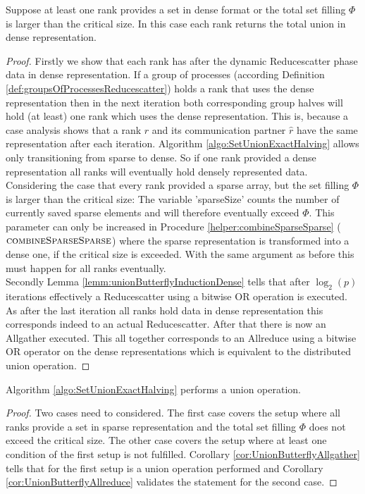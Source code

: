 \begin{corollary}
	Suppose at least one rank provides a set in dense format or the total set filling $\Phi$ is larger than the critical size. In this case each rank returns the total union in dense representation.
\end{corollary}\label{cor:UnionButterflyAllreduce}
\begin{proof}
	Firstly we show that each rank has after the dynamic Reducescatter phase data in dense representation. If a group of processes (according Definition \ref{def:groupsOfProcessesReducescatter}) holds a rank that uses the dense representation then in the next iteration both corresponding group halves will hold (at least) one rank which uses the dense representation. This is, because a case analysis shows that a rank $r$ and its communication partner $\hat{r}$ have the same representation after each iteration. Algorithm \ref{algo:SetUnionExactHalving} allows only transitioning from sparse to dense. So if one rank provided a dense representation all ranks will eventually hold densely represented data. Considering the case that every rank provided a sparse array, but the set filling $\Phi$ is larger than the critical size: The variable 'sparseSize' counts the number of currently saved sparse elements and will therefore eventually exceed $\Phi$. This parameter can only be increased in Procedure \ref{helper:combineSparseSparse} ($\Call{combineSparseSparse}{}$) where the sparse representation is transformed into a dense one, if the critical size is exceeded. With the same argument as before this must happen for all ranks eventually.\\
	Secondly Lemma \ref{lemm:unionButterflyInductionDense} tells that after $\log_2(p)$ iterations effectively a Reducescatter using a bitwise OR operation is executed. As after the last iteration all ranks hold data in dense representation this corresponds indeed to an actual Reducescatter. After that there is now an Allgather executed. This all together corresponds to an Allreduce using a bitwise OR operator on the dense representations which is equivalent to the distributed union operation.	
\end{proof}
\begin{theorem}
	Algorithm \ref{algo:SetUnionExactHalving} performs a union operation.
\end{theorem}
\begin{proof}
	Two cases need to considered. The first case covers the setup where all ranks provide a set in sparse representation and the total set filling $\Phi$ does not exceed the critical size. The other case covers the setup where at least one condition of the first setup is not fulfilled. Corollary \ref{cor:UnionButterflyAllgather} tells that for the first setup is a union operation performed and Corollary \ref{cor:UnionButterflyAllreduce} validates the statement for the second case.
\end{proof}

